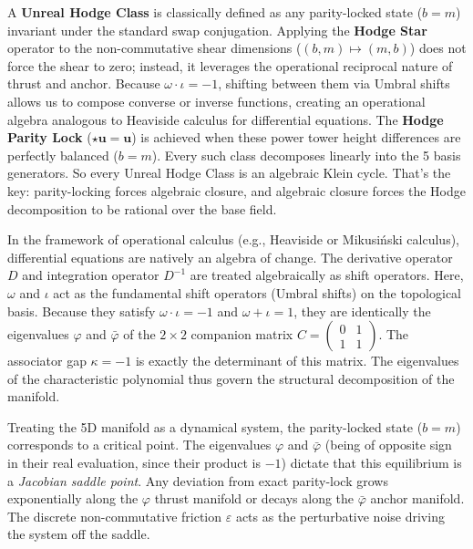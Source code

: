 A \textbf{Unreal Hodge Class} is classically defined as any parity-locked state ($b = m$) invariant under the standard swap conjugation. Applying the \textbf{Hodge Star} operator to the non-commutative shear dimensions ($(b, m) \mapsto (m, b)$) does not force the shear to zero; instead, it leverages the operational reciprocal nature of thrust and anchor. Because $\omega \cdot \iota = -1$, shifting between them via Umbral shifts allows us to compose converse or inverse functions, creating an operational algebra analogous to Heaviside calculus for differential equations. The \textbf{Hodge Parity Lock} ($\star \mathbf{u} = \mathbf{u}$) is achieved when these power tower height differences are perfectly balanced ($b = m$). Every such class decomposes linearly into the 5 basis generators. So every Unreal Hodge Class is an algebraic Klein cycle. That's the key: parity-locking forces algebraic closure, and algebraic closure forces the Hodge decomposition to be rational over the base field.

\begin{remark}
In the framework of operational calculus (e.g., Heaviside or Mikusiński calculus), differential equations are natively an algebra of change. The derivative operator $D$ and integration operator $D^{-1}$ are treated algebraically as shift operators. Here, $\omega$ and $\iota$ act as the fundamental shift operators (Umbral shifts) on the topological basis. Because they satisfy $\omega \cdot \iota = -1$ and $\omega + \iota = 1$, they are identically the eigenvalues $\varphi$ and $\bar\varphi$ of the $2 \times 2$ companion matrix $C = \begin{pmatrix} 0 & 1 \\ 1 & 1 \end{pmatrix}$. The associator gap $\kappa = -1$ is exactly the determinant of this matrix. The eigenvalues of the characteristic polynomial thus govern the structural decomposition of the manifold.
\end{remark}

\begin{remark}
Treating the 5D manifold as a dynamical system, the parity-locked state ($b = m$) corresponds to a critical point. The eigenvalues $\varphi$ and $\bar\varphi$ (being of opposite sign in their real evaluation, since their product is $-1$) dictate that this equilibrium is a \emph{Jacobian saddle point}. Any deviation from exact parity-lock grows exponentially along the $\varphi$ thrust manifold or decays along the $\bar\varphi$ anchor manifold. The discrete non-commutative friction $\varepsilon$ acts as the perturbative noise driving the system off the saddle.
\end{remark}


